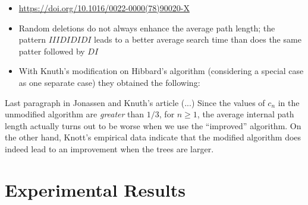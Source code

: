 \documentclass{beamer}
\begin{document}
\begin{frame}
    \begin{itemize}
        \item \url{https://doi.org/10.1016/0022-0000(78)90020-X}
            \pause
        \item Random deletions do not always enhance the average path length; the pattern $IIIDIDIDI$ leads to a better average search time than does the same patter followed by $DI$
            \pause
        \item With Knuth's modification on Hibbard's algorithm (considering a special case as one separate case) they obtained the following:
    \end{itemize}
    \begin{block}{Last paragraph in Jonassen and Knuth's article}
        (...) Since the values of $c_n$ in the unmodified algorithm are \textit{greater} than $1/3$, for $n \geq 1$, the average internal path length actually turns out to be worse when we use the ``improved'' algorithm. On the other hand, Knott's empirical data indicate that the modified algorithm does indeed lead to an improvement when the trees are larger.
    \end{block}
\end{frame}

\section{Experimental Results}
\end{document}

